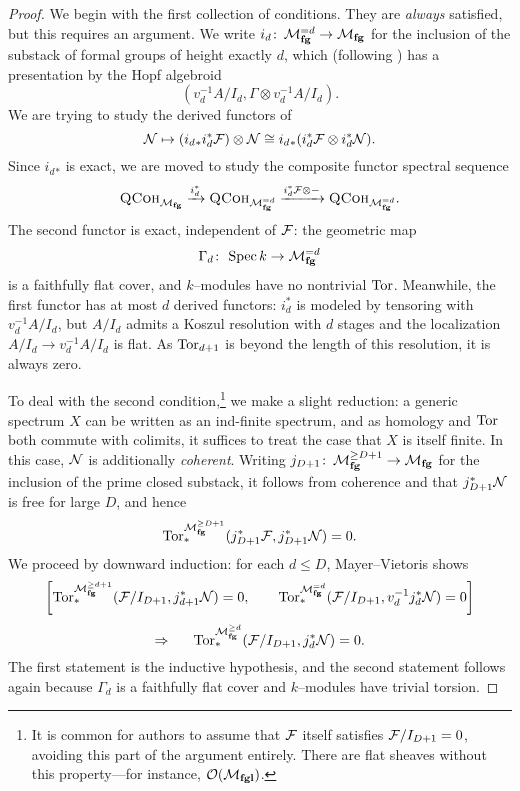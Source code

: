 \begin{proof}
We begin with the first collection of conditions.  They are \emph{always} satisfied, but this requires an argument.  We write \(i_d\colon\thinspace \mathcal{M}_{\mathbf{fg}}^{= d} \to \mathcal{M}_{\mathbf{fg}}\) for the inclusion of the substack of formal groups of height exactly \(d\), which (following ) has a presentation by the Hopf algebroid \[(v_d^{-1} A / I_d, \Gamma \otimes v_d^{-1} A / I_d).\]  We are trying to study the derived functors of \[\mathcal{N} \mapsto (i_d{}_* i_d^* \mathcal{F}) \otimes \mathcal{N} \cong i_d{}_* (i_d^* \mathcal{F} \otimes i_d^* \mathcal{N}).\]  Since \(i_d{}_*\) is exact, we are moved to study the composite functor spectral sequence \[\normalfont\textsc{QCoh}_{\mathcal{M}_{\mathbf{fg}}} \xrightarrow{i_d^*} \normalfont\textsc{QCoh}_{\mathcal{M}_{\mathbf{fg}}^{=d}} \xrightarrow{i_d^* \mathcal{F} \otimes -} \normalfont\textsc{QCoh}_{\mathcal{M}_{\mathbf{fg}}^{=d}}.\]  The second functor is exact, independent of \(\mathcal{F}\): the geometric map \[\Gamma_d\colon\thinspace \operatorname{Spec} k \to \mathcal{M}_{\mathbf{fg}}^{=d}\] is a faithfully flat cover, and \(k\)--modules have no nontrivial \(\operatorname{Tor}\).  Meanwhile, the first functor has at most \(d\) derived functors: \(i_d^*\) is modeled by tensoring with \(v_d^{-1} A / I_d\), but \(A / I_d\) admits a Koszul resolution with \(d\) stages and the localization \(A / I_d \to v_d^{-1} A / I_d\) is flat.  As \(\operatorname{Tor}_{d+1}\) is beyond the length of this resolution, it is always zero.

To deal with the second condition,\footnote{It is common for authors to assume that \(\mathcal{F}\) itself satisfies \(\mathcal{F} / I_{D+1} = 0\), avoiding this part of the argument entirely.  There are flat sheaves without this property---for instance, \(\mathcal{O}(\mathcal{M}_{\mathbf{fgl}})\).} we make a slight reduction: a generic spectrum \(X\) can be written as an ind-finite spectrum, and as homology and \(\operatorname{Tor}\) both commute with colimits, it suffices to treat the case that \(X\) is itself finite.  In this case, \(\mathcal{N}\) is additionally \emph{coherent}.  Writing \(j_{D+1}\colon\thinspace \mathcal{M}_{\mathbf{fg}}^{\ge D+1} \to \mathcal{M}_{\mathbf{fg}}\) for the inclusion of the prime closed substack, it follows from coherence and  that \(j_{D+1}^* \mathcal{N}\) is free for large \(D\), and hence \[\operatorname{Tor}_*^{\mathcal{M}_{\mathbf{fg}}^{\ge D+1}}( j_{D+1}^* \mathcal{F}, j_{D+1}^* \mathcal{N}) = 0.\]  We proceed by downward induction: for each \(d \le D\), Mayer--Vietoris shows
\[
\left[\operatorname{Tor}^{\mathcal{M}_{\mathbf{fg}}^{\ge d+1}}_*(\mathcal{F} / I_{D+1}, j_{d+1}^* \mathcal{N}) = 0, \quad \quad \operatorname{Tor}^{\mathcal{M}_{\mathbf{fg}}^{= d}}_*(\mathcal{F} / I_{D+1}, v_d^{-1} j_d^* \mathcal{N}) = 0\right]
\]\vspace{-\baselineskip}\[
\Rightarrow \quad\quad\!\!\! \operatorname{Tor}^{\mathcal{M}_{\mathbf{fg}}^{\ge d}}_*(\mathcal{F} / I_{D+1}, j_d^* \mathcal{N}) = 0.
\]
The first statement is the inductive hypothesis, and the second statement follows again because \(\Gamma_d\) is a faithfully flat cover and \(k\)--modules have trivial torsion.
\end{proof}

